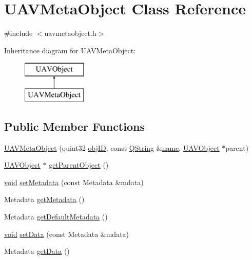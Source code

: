 \hypertarget{class_u_a_v_meta_object}{\section{\-U\-A\-V\-Meta\-Object \-Class \-Reference}
\label{class_u_a_v_meta_object}
}


{\ttfamily \#include $<$uavmetaobject.\-h$>$}

\-Inheritance diagram for \-U\-A\-V\-Meta\-Object\-:\begin{figure}[H]
\begin{center}
\leavevmode
\includegraphics[height=2.000000cm]{class_u_a_v_meta_object}
\end{center}
\end{figure}
\subsection*{\-Public \-Member \-Functions}
\begin{DoxyCompactItemize}
\item 
\hyperlink{group___u_a_v_objects_plugin_ga82e8ae42383522ae0507b881d11abba5}{\-U\-A\-V\-Meta\-Object} (quint32 \hyperlink{group___u_a_v_objects_plugin_gafc50acdaa311c9fd9aaddf90fd578c14}{obj\-I\-D}, const \hyperlink{group___u_a_v_objects_plugin_gab9d252f49c333c94a72f97ce3105a32d}{\-Q\-String} \&\hyperlink{group___u_a_v_objects_plugin_gadf898ed0961464f4a3f8e05fb28019f5}{name}, \hyperlink{class_u_a_v_object}{\-U\-A\-V\-Object} $\ast$parent)
\item 
\hyperlink{class_u_a_v_object}{\-U\-A\-V\-Object} $\ast$ \hyperlink{group___u_a_v_objects_plugin_gabfdc167657f1b0eae61e412313785e7b}{get\-Parent\-Object} ()
\item 
\hyperlink{group___u_a_v_objects_plugin_ga444cf2ff3f0ecbe028adce838d373f5c}{void} \hyperlink{group___u_a_v_objects_plugin_ga714e256632f9fbd0aba5c6a9aaae422a}{set\-Metadata} (const \-Metadata \&mdata)
\item 
\-Metadata \hyperlink{group___u_a_v_objects_plugin_ga3830028095cc0fceed15e72baae231d9}{get\-Metadata} ()
\item 
\-Metadata \hyperlink{group___u_a_v_objects_plugin_ga151811823619af6a7231118c8e64f843}{get\-Default\-Metadata} ()
\item 
\hyperlink{group___u_a_v_objects_plugin_ga444cf2ff3f0ecbe028adce838d373f5c}{void} \hyperlink{group___u_a_v_objects_plugin_ga442400ff0a37c73b50d6e5ad9533ace4}{set\-Data} (const \-Metadata \&mdata)
\item 
\-Metadata \hyperlink{group___u_a_v_objects_plugin_gaa60fd952fa89a624b43ba3dcf4a7c953}{get\-Data} ()
\end{DoxyCompactItemize}


